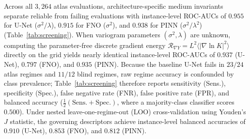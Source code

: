 \documentclass[preprint,12pt,authoryear]{elsarticle}
\begin{document}
Across all $3{,}264$ atlas evaluations, architecture-specific medium invariants separate reliable from failing evaluations with instance-level ROC-AUCs of $0.955$ for U-Net ($\sigma^2/\lambda$), $0.915$ for FNO ($\sigma^2$), and $0.938$ for PINN ($\sigma^2/\lambda^2$) (Table~\ref{tab:screening}). When variogram parameters $(\sigma^2, \lambda)$ are unknown, computing the parameter-free discrete gradient energy $\mathcal{R}_{\nabla Y} = L^2\langle|\nabla\ln K|^2\rangle$ directly on the grid yields nearly identical instance-level ROC-AUCs of $0.937$ (U-Net), $0.797$ (FNO), and $0.935$ (PINN). Because the baseline U-Net fails in $23/24$ atlas regimes and $11/12$ blind regimes, raw regime accuracy is confounded by class prevalence; Table~\ref{tab:screening} therefore reports sensitivity (Sens.), specificity (Spec.), false negative rate (FNR), false positive rate (FPR), and balanced accuracy ($\frac{1}{2}(\text{Sens.} + \text{Spec.})$, where a majority-class classifier scores $0.500$). Under nested leave-one-regime-out (LOO) cross-validation using Youden's $J$ statistic, the governing descriptors achieve instance-level balanced accuracies of $0.910$ (U-Net), $0.853$ (FNO), and $0.812$ (PINN).

\begin{table}[t!]
\centering
\caption{Stage~1 pre-training roughness screening across the 24-regime atlas and 12 prospective off-grid blind regimes ($64$ test realizations/regime). To account for class prevalence in baseline U-Net (23/24 atlas and 11/12 blind regimes failing), threshold-free instance ROC-AUC, sensitivity (Sens.), specificity (Spec.), false negative rate (FNR), false positive rate (FPR), and balanced accuracy (Bal.\ Acc., versus $0.500$ for a majority-class guess) are reported. Thresholds ($\sigma^2/\lambda \ge 3.33$ for U-Net, $\sigma^2 \ge 0.75$ for FNO) were frozen prior to blind testing.}
\label{tab:screening}
\end{table}
\end{document}
